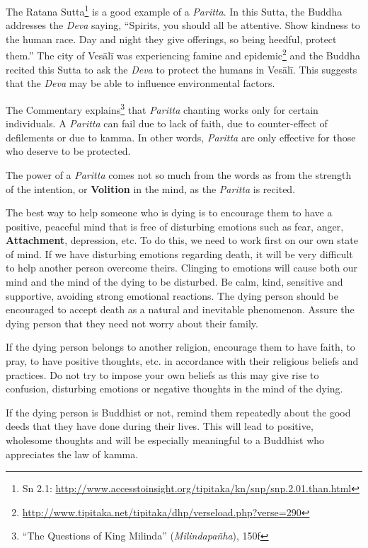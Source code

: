 The Ratana Sutta\footnote{Sn 2.1: \url{http://www.accesstoinsight.org/tipitaka/kn/snp/snp.2.01.than.html}} is a good example of a \textit{Paritta}. In this Sutta, the Buddha addresses the \textit{Deva} saying, “Spirits, you should all be attentive. Show kindness to the human race. Day and night they give offerings, so being heedful, protect them.” The city of Vesālī was experiencing famine and epidemic\footnote{\url{http://www.tipitaka.net/tipitaka/dhp/verseload.php?verse=290}} and the Buddha recited this Sutta to ask the \textit{Deva} to protect the humans in Vesālī. This suggests that the \textit{Deva} may be able to influence environmental factors.

The Commentary explains\footnote{“The Questions of King Milinda” (\textit{Milindapañha}), 150f} that \textit{Paritta} chanting works only for certain individuals. A \textit{Paritta} can fail due to lack of faith, due to counter-effect of defilements or due to kamma. In other words, \textit{Paritta} are only effective for those who deserve to be protected.

The power of a \textit{Paritta} comes not so much from the words as from the strength of the intention, or \textbf{Volition} in the mind, as the \textit{Paritta} is recited.


The best way to help someone who is dying is to encourage them to have a positive, peaceful mind that is free of disturbing emotions such as fear, anger, \textbf{Attachment}, depression, etc. To do this, we need to work first on our own state of mind. If we have disturbing emotions regarding death, it will be very difficult to help another person overcome theirs. Clinging to emotions will cause both our mind and the mind of the dying to be disturbed. Be calm, kind, sensitive and supportive, avoiding strong emotional reactions. The dying person should be encouraged to accept death as a natural and inevitable phenomenon. Assure the dying person that they need not worry about their family.

If the dying person belongs to another religion, encourage them to have faith, to pray, to have positive thoughts, etc. in accordance with their religious beliefs and practices. Do not try to impose your own beliefs as this may give rise to confusion, disturbing emotions or negative thoughts in the mind of the dying.

If the dying person is Buddhist or not, remind them repeatedly about the good deeds that they have done during their lives. This will lead to positive, wholesome thoughts and will be especially meaningful to a Buddhist who appreciates the law of kamma.

